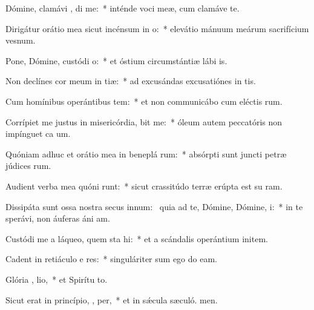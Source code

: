 \item Dómine, clamávi  , di me:~* inténde voci meæ, cum clamáve  te.
\item Dirigátur orátio mea sicut incénsum in  o:~* elevátio mánuum meárum sacrifícium vesnum.
\item Pone, Dómine, custódi  o:~* et óstium circumstántiæ lábi is.
\item Non declínes cor meum in  tiæ:~* ad excusándas excusatiónes in tis.
\item Cum homínibus operántibus tem:~* et non communicábo cum eléctis rum.
\item Corrípiet me justus in misericórdia,  bit me:~* óleum autem peccatóris non impínguet ca um.
\item Quóniam adhuc et orátio mea in beneplá rum:~* absórpti sunt juncti petræ júdices rum.
\item Audient verba mea quóni runt:~* sicut crassitúdo terræ erúpta est su ram.
\item Dissipáta sunt ossa nostra secus innum:~\pscross{} quia ad te, Dómine, Dómine,  i:~* in te sperávi, non áuferas áni am.
\item Custódi me a láqueo, quem sta hi:~* et a scándalis operántium initem.
\item Cadent in retiáculo e res:~* singuláriter sum ego do eam.
\item Glória ,  lio,~* et Spirítu to.
\item Sicut erat in princípio,  ,  per,~* et in sǽcula sæculó. men.
